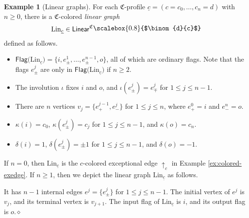 \documentclass[11pt]{amsbook}
\numberwithin{section}{chapter}
\numberwithin{subsection}{section}
\numberwithin{equation}{section}
\theoremstyle{plain}
\theoremstyle{definition}
\newtheorem{example}[equation]{Example}
\newcommand{\colorc}{\mathfrak{C}}
\newcommand{\Flag}{\mathsf{Flag}}
\newcommand{\Lin}{\mathrm{Lin}}
\newcommand{\dqed}{\hfill$\diamond$}
\newcommand{\Linear}{\mathsf{Linear}}
\newcommand{\Linearc}{\Linear^{\colorc}}
\newcommand{\uc}{\underline c}
\newcommand{\smallprof}[1]
{\raisebox{.05cm}{\scalebox{0.8}{#1}}}
\newcommand{\dc}{\smallprof{$\binom{d}{c}$}}
\begin{document}
\begin{example}[Linear graphs]\label{ex:linear-graph}
For each $\colorc$-profile $\uc=(c=c_0,\ldots,c_n=d)$ with $n \geq 0$, there is a $\colorc$-colored \emph{linear graph} \[\Lin_{\uc} \in \Linearc\dc\] defined as follows.
\begin{itemize}
\item $\Flag\bigl(\Lin_{\uc}\bigr) = \bigl\{i,e^1_{\pm},\ldots,e^{n-1}_{\pm},o\bigr\}$, all of which are ordinary flags.  Note that the flags $e^j_{\pm}$ are only in $\Flag\bigl(\Lin_{\uc}\bigr)$ if $n\geq 2$.
\item The involution $\iota$ fixes $i$ and $o$, and $\iota(e^j_{\pm})=e^j_{\mp}$ for $1\leq j \leq n-1$.
\item There are $n$ vertices $v_j = \{e^{j-1}_+,e^j_-\}$ for $1\leq j \leq n$, where $e^0_+=i$ and $e^n_-=o$.
\item $\kappa(i)=c_0$, $\kappa(e^j_{\pm}) = c_j$ for $1 \leq j \leq n-1$, and $\kappa(o)=c_n$.
\item $\delta(i)=1$, $\delta(e^j_{\pm})=\pm 1$ for $1 \leq j \leq n-1$, and $\delta(o)=-1$.
\end{itemize}
If $n=0$, then $\Lin_{\uc}$ is the $c$-colored exceptional edge $\uparrow_c$ in Example \ref{ex:colored-exedge}.  If $n \geq 1$, then we depict the linear graph $\Lin_{\uc}$ as follows.
\begin{center}\end{center}
It has $n-1$ internal edges $e^j=\{e^j_{\pm}\}$ for $1 \leq j \leq n-1$.  The initial vertex of $e^j$ is $v_j$, and its terminal vertex is $v_{j+1}$.  The input flag of $\Lin_{\uc}$ is $i$, and its output flag is $o$.\dqed
\end{example}
\end{document}
